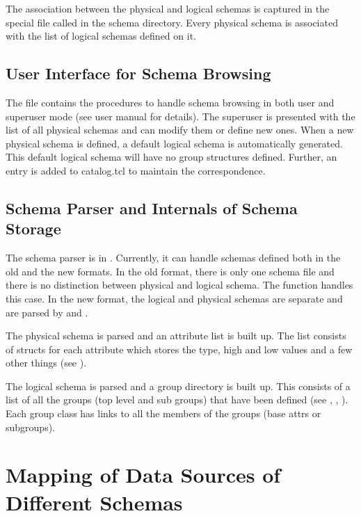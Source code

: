 The association between the physical and logical schemas is captured
in the special file called  in the schema
directory.  Every physical schema is associated with the list of
logical schemas defined on it.

\subsection{User Interface for Schema Browsing}

The file  contains the procedures to
handle schema browsing in both user and superuser mode (see user
manual for details).  The superuser is presented with the list of all
physical schemas and can modify them or define new ones. When a new
physical schema is defined, a default logical schema is automatically
generated. This default logical schema will have no group structures
defined.  Further, an entry is added to catalog.tcl to maintain the
correspondence.

\subsection{Schema Parser and Internals of Schema Storage}

The schema parser is in
. Currently, it can handle
schemas defined both in the old and the new formats. In the old
format, there is only one schema file and there is no distinction
between physical and logical schema. The function
 handles this case. In the new format, the
logical and physical schemas are separate and are parsed by
 and .

The physical schema is parsed and an attribute list is built up. The
list consists of  structs for each attribute which
stores the type, high and low values and a few other things (see
).

The logical schema is parsed and a group directory is built up. This
consists of a list of all the groups (top level and sub groups) that
have been defined (see ,
, ). Each group class has
links to all the members of the groups (base attrs or subgroups).

\section{Mapping of Data Sources of Different Schemas}

